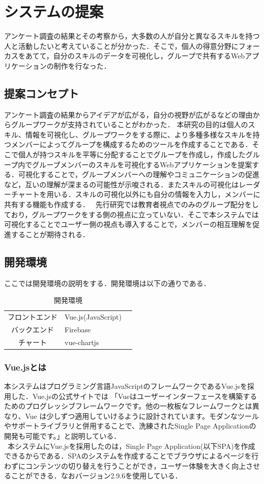\documentclass{funthesis}
\begin{document}
\chapter{システムの提案}
アンケート調査の結果とその考察から，大多数の人が自分と異なるスキルを持つ人と活動したいと考えていることが分かった．そこで，個人の得意分野にフォーカスをあてて，自分のスキルのデータを可視化し，グループで共有するWebアプリケーションの制作を行なった．

\section{提案コンセプト}
アンケート調査の結果からアイデアが広がる，自分の視野が広がるなどの理由からグループワークが支持されていることがわかった．
本研究の目的は個人のスキル、情報を可視化し、グループワークをする際に、より多種多様なスキルを持つメンバーによってグループを構成するためのツールを作成することである．そこで個人が持つスキルを平等に分配することでグループを作成し，作成したグループ内でグループメンバーのスキルを可視化するWebアプリケーションを提案する．可視化することで，グループメンバーへの理解やコミュニケーションの促進など，互いの理解が深まるの可能性が示唆される．またスキルの可視化はレーダーチャートを用いる．スキルの可視化以外にも自分の情報を入力し，メンバーに共有する機能も作成する．
\ 先行研究では教育者視点でのみのグループ配分をしており，グループワークをする側の視点に立っていない．そこで本システムでは可視化することでユーザー側の視点も導入することで，メンバーの相互理解を促進することが期待される．
\section{開発環境}
ここでは開発環境の説明をする．開発環境は以下の通りである．
\begin{table}[h]
\begin{center}
  \begin{tabular}{cll} \hline
    フロントエンド & Vue.js(JavaScript)  \tabularnewline
    バックエンド& Firebase\tabularnewline
    チャート &vue-chartjs \tabularnewline
    \hline
  \end{tabular}
  \caption{開発環境}
  \label{開発環境}
  \end{center}
\end{table}

\subsection{Vue.jsとは}
本システムはプログラミング言語JavaScriptのフレームワークであるVue.jsを採用した．Vue.jsの公式サイトでは
「Vueはユーザーインターフェースを構築するためのプログレッシブフレームワークです。他の一枚板なフレームワークとは異なり、Vue は少しずつ適用していけるように設計されています。モダンなツールやサポートライブラリと併用することで、洗練されたSingle Page Applicationの開発も可能です。」\cite{A16}と説明している．\\
\ 本システムにVue.jsを採用したのは，Single Page Application(以下SPA)を作成できるからである．SPAのシステムを作成することでブラウザによるページを行わずにコンテンツの切り替えを行うことができ，ユーザー体験を大きく向上させることができる．なおバージョン2.9.6を使用している．
\end{document}
